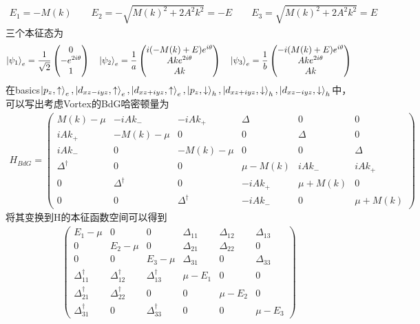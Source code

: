 \documentclass[22pt]{article}
\begin{document}
\begin{align}
	E_1=-M(k) \qquad E_2=-\sqrt{M(k)^2+2A^2k^2}=-E\qquad 
	E_3=\sqrt{M(k)^2+2A^2k^2}
	=E
\end{align}
三个本征态为
\begin{align}
	\ket{\psi_{1}}_e=\frac{1}{\sqrt{2}}
	\begin{pmatrix}
		0\\
		-e^{2i\theta}\\
		1
	\end{pmatrix}
\quad
\ket{\psi_{2}}_e=\frac{1}{a}
\begin{pmatrix}
	i(-M(k)+E)e^{i\theta}\\
	Ake^{2i\theta}\\
	Ak
\end{pmatrix}
\quad
\ket{\psi_{3}}_e=
\frac{1}{b}
\begin{pmatrix}
	-i(M(k)+E)e^{i\theta}\\
	Ake^{2i\theta}\\
	Ak
\end{pmatrix}
\end{align}
在basics$\ket{p_z,\uparrow}_e,\ket{d_{xz-iyz},\uparrow}_e,\ket{d_{xz+iyz},\uparrow}_e,\ket{p_z,\downarrow}_h,\ket{d_{xz+iyz},\downarrow}_h,\ket{d_{xz-iyz},\downarrow}_h$中，可以写出考虑Vortex的BdG哈密顿量为
\begin{align}
	H_{BdG}=
	\begin{pmatrix}
			M(k)-\mu& -iAk_{-}&-iAk_{+} &\Delta&0&0\\
			iAk_{+}&-M(k)-\mu&0&0&\Delta&0\\
			iAk_{-}&0&-M(k)-\mu&0&0&\Delta\\
			\Delta^{\dagger}&0&0&\mu-M(k)&iAk_{-}&iAk_{+}\\
			0&\Delta^{\dagger}&0&-iAk_{+}&\mu+M(k)&0\\
			0&0&\Delta^{\dagger}&-iAk_{-}&0&\mu+M(k)
	\end{pmatrix}
\end{align}
将其变换到H的本征函数空间可以得到
\begin{align}
	\begin{pmatrix}
		E_1-\mu &0&0& \Delta_{11}&\Delta_{12}&\Delta_{13}\\
		0&E_2-\mu&0&\Delta_{21}&\Delta_{22}&0\\
		0&0&E_3-\mu&\Delta_{31}&0&\Delta_{33}\\
		\Delta_{11}^{\dagger}&\Delta_{12}^{\dagger}&\Delta_{13}^{\dagger}&\mu-E_1&0&0\\
		\Delta_{21}^{\dagger}&\Delta_{22}^{\dagger}&0&0&\mu-E_2&0\\
		\Delta_{31}^{\dagger}&0&\Delta_{33}^{\dagger}&0&0&\mu-E_3
	\end{pmatrix}
\end{align}
\end{document}
